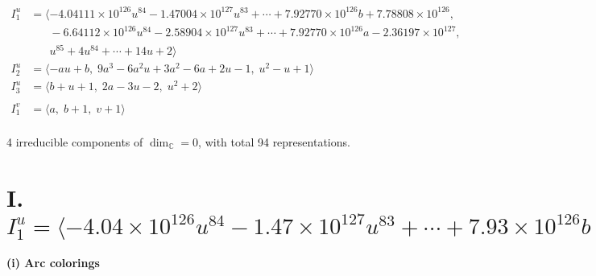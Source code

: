 \documentclass[1p]{elsarticle_modified}
\theoremstyle{definition}
\begin{document}
\begin{align*}
I^u_{1}&=\langle 
-4.04111\times10^{126} u^{84}-1.47004\times10^{127} u^{83}+\cdots+7.92770\times10^{126} b+7.78808\times10^{126},\\
\phantom{I^u_{1}}&\phantom{= \langle  }-6.64112\times10^{126} u^{84}-2.58904\times10^{127} u^{83}+\cdots+7.92770\times10^{126} a-2.36197\times10^{127},\\
\phantom{I^u_{1}}&\phantom{= \langle  }u^{85}+4 u^{84}+\cdots+14 u+2\rangle \\
I^u_{2}&=\langle 
- a u+b,\;9 a^3-6 a^2 u+3 a^2-6 a+2 u-1,\;u^2- u+1\rangle \\
I^u_{3}&=\langle 
b+u+1,\;2 a-3 u-2,\;u^2+2\rangle \\
\\
I^v_{1}&=\langle 
a,\;b+1,\;v+1\rangle \\
\end{align*}
\raggedright * 4 irreducible components of $\dim_{\mathbb{C}}=0$, with total 94 representations.\\
\newpage
\renewcommand{\arraystretch}{1}
\centering \section*{I. $I^u_{1}= \langle -4.04\times10^{126} u^{84}-1.47\times10^{127} u^{83}+\cdots+7.93\times10^{126} b+7.79\times10^{126},\;-6.64\times10^{126} u^{84}-2.59\times10^{127} u^{83}+\cdots+7.93\times10^{126} a-2.36\times10^{127},\;u^{85}+4 u^{84}+\cdots+14 u+2 \rangle$}
\flushleft \textbf{(i) Arc colorings}\\
\end{document}
